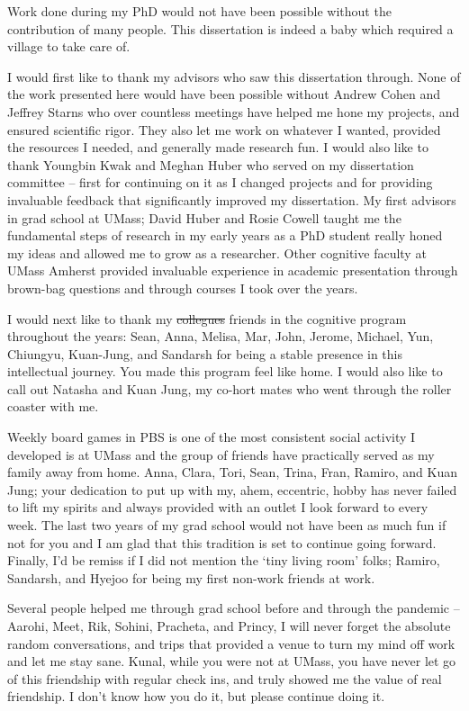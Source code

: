 Work done during my PhD would not have been possible without the contribution of many people. This dissertation is indeed a baby which required a village to take care of.

I would first like to thank my advisors who saw this dissertation through. None of the work presented here would have been possible without Andrew Cohen and Jeffrey Starns who over countless meetings have helped me hone my projects, and ensured scientific rigor. They also let me work on whatever I wanted, provided the resources I needed, and generally made research fun. I would also like to thank Youngbin Kwak and Meghan Huber who served on my dissertation committee -- first for continuing on it as I changed projects and for providing invaluable feedback that significantly improved my dissertation. My first advisors in grad school at UMass; David Huber and Rosie Cowell taught me the fundamental steps of research in my early years as a PhD student really honed my ideas and allowed me to grow as a researcher. Other cognitive faculty at UMass Amherst provided invaluable experience in academic presentation through brown-bag questions and through courses I took over the years. 

I would next like to thank my \st{collegues} friends in the cognitive program throughout the years: Sean, Anna, Melisa, Mar, John, Jerome, Michael, Yun, Chiungyu, Kuan-Jung, and Sandarsh for being a stable presence in this intellectual journey. You made this program feel like home. I would also like to call out Natasha and Kuan Jung, my co-hort mates who went through the roller coaster with me. 

Weekly board games in PBS is one of the most consistent social activity I developed is at UMass and the group of friends have practically served as my family away from home. Anna, Clara, Tori, Sean, Trina, Fran, Ramiro, and Kuan Jung; your dedication to put up with my, ahem, eccentric, hobby has never failed to lift my spirits and always provided with an outlet I look forward to every week. The last two years of my grad school would not have been as much fun if not for you and I am glad that this tradition is set to continue going forward. Finally, I'd be remiss if I did not mention the `tiny living room' folks; Ramiro, Sandarsh, and Hyejoo for being my first non-work friends at work. 

Several people helped me through grad school before and through the pandemic -- Aarohi, Meet, Rik, Sohini, Pracheta, and Princy, I will never forget the absolute random conversations, and trips that provided a venue to turn my mind off work and let me stay sane. Kunal, while you were not at UMass, you have never let go of this friendship with regular check ins, and truly showed me the value of real friendship. I don't know how you do it, but please continue doing it.

